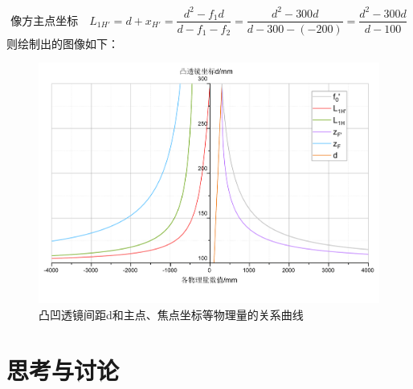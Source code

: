 \documentclass[UTF8]{ctexart}
\begin{document}
\[\text{像方主点坐标}\quad L_{1H'}=d+x_{H'}=\frac{d^2-f_1d}{d-f_1-f_2}=\frac{d^2-300d}{d-300-(-200)}=\frac{d^2-300d}{d-100}\]
则绘制出的图像如下：
\begin{figure}[H]
    \begin{center}
    \includegraphics[scale=0.5]{graph.pdf}\vspace{-2.5em}
    \caption{凸凹透镜间距d和主点、焦点坐标等物理量的关系曲线}
    \end{center}
\end{figure}



\section{思考与讨论}
\end{document}
